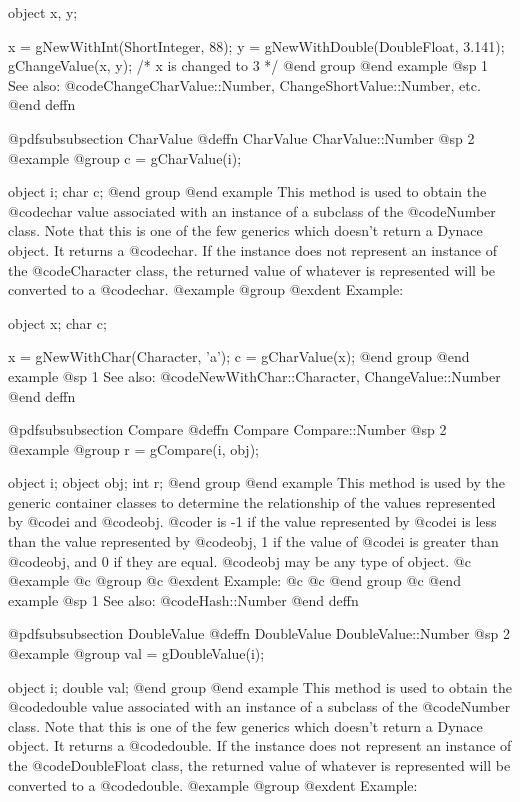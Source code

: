 object  x, y;

x = gNewWithInt(ShortInteger, 88);
y = gNewWithDouble(DoubleFloat, 3.141);
gChangeValue(x, y);    /*  x is changed to 3  */
@end group
@end example
@sp 1
See also:  @code{ChangeCharValue::Number, ChangeShortValue::Number, etc.}
@end deffn










@pdfsubsubsection {CharValue}
@deffn {CharValue} CharValue::Number
@sp 2
@example
@group
c = gCharValue(i);

object  i;
char    c;
@end group
@end example
This method is used to obtain the @code{char} value associated with an
instance of a subclass of the @code{Number} class.  Note that this is
one of the few generics which doesn't return a Dynace object.  It
returns a @code{char}.  If the instance does not represent an instance
of the @code{Character} class, the returned value of whatever is
represented will be converted to a @code{char}.
@example
@group
@exdent Example:

object  x;
char    c;

x = gNewWithChar(Character, 'a');
c = gCharValue(x);
@end group
@end example
@sp 1
See also:  @code{NewWithChar::Character, ChangeValue::Number}
@end deffn








@pdfsubsubsection {Compare}
@deffn {Compare} Compare::Number
@sp 2
@example
@group
r = gCompare(i, obj);

object  i;
object  obj;
int     r;
@end group
@end example
This method is used by the generic container classes to determine
the relationship of the values represented by @code{i} and @code{obj}. 
@code{r} is -1 if the value represented by @code{i} is less than
the value represented by @code{obj}, 1 if the value of @code{i}
is greater than @code{obj}, and 0 if they are equal.  @code{obj}
may be any type of object.
@c @example
@c @group
@c @exdent Example:
@c
@c @end group
@c @end example
@sp 1
See also:  @code{Hash::Number}
@end deffn







@pdfsubsubsection {DoubleValue}
@deffn {DoubleValue} DoubleValue::Number
@sp 2
@example
@group
val = gDoubleValue(i);

object  i;
double  val;
@end group
@end example
This method is used to obtain the @code{double} value associated
with an instance of a subclass of the @code{Number} class.  Note that
this is one of the few generics which doesn't return a Dynace object.
It returns a @code{double}.  If the instance does not represent
an instance of the @code{DoubleFloat} class, the returned value
of whatever is represented will be converted to a @code{double}.
@example
@group
@exdent Example:

